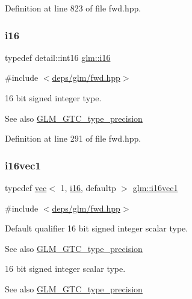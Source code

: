 Definition at line 823 of file fwd.\+hpp.

\mbox{\label{group__gtc__type__precision_ga35e5542ca05b29cc256fdafb8503d1fd}} 
\subsubsection{\texorpdfstring{i16}{i16}}
{\footnotesize\ttfamily typedef detail\+::int16 \hyperlink{group__gtc__type__precision_ga35e5542ca05b29cc256fdafb8503d1fd}{glm\+::i16}}



{\ttfamily \#include $<$\hyperlink{fwd_8hpp}{deps/glm/fwd.\+hpp}$>$}

16 bit signed integer type. \begin{DoxySeeAlso}{See also}
\hyperlink{group__gtc__type__precision}{G\+L\+M\+\_\+\+G\+T\+C\+\_\+type\+\_\+precision} 
\end{DoxySeeAlso}


Definition at line 291 of file fwd.\+hpp.

\mbox{\label{group__gtc__type__precision_ga51ac9cc5aa60aa41bf37ccbf900db94f}} 
\subsubsection{\texorpdfstring{i16vec1}{i16vec1}}
{\footnotesize\ttfamily typedef \hyperlink{structglm_1_1vec}{vec}$<$ 1, \hyperlink{group__gtc__type__precision_ga35e5542ca05b29cc256fdafb8503d1fd}{i16}, defaultp $>$ \hyperlink{group__gtc__type__precision_ga51ac9cc5aa60aa41bf37ccbf900db94f}{glm\+::i16vec1}}



{\ttfamily \#include $<$\hyperlink{fwd_8hpp}{deps/glm/fwd.\+hpp}$>$}

Default qualifier 16 bit signed integer scalar type. \begin{DoxySeeAlso}{See also}
\hyperlink{group__gtc__type__precision}{G\+L\+M\+\_\+\+G\+T\+C\+\_\+type\+\_\+precision}
\end{DoxySeeAlso}
16 bit signed integer scalar type. \begin{DoxySeeAlso}{See also}
\hyperlink{group__gtc__type__precision}{G\+L\+M\+\_\+\+G\+T\+C\+\_\+type\+\_\+precision} 
\end{DoxySeeAlso}


